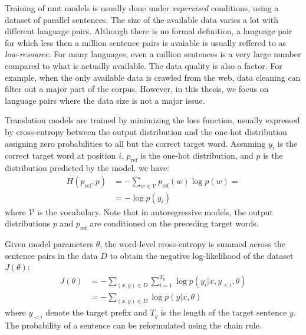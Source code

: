 Training of \ac{nmt} models is usually done under \emph{supervised} conditions,
using a dataset of parallel sentences. The size of the available data varies a
lot with different language pairs. Although there is no formal definition, a
language pair for which less then a million sentence pairs is avaiable is
usually reffered to as \emph{low-resource}. For many languages, even a million
sentences is a very large number compared to what is actually available. The
data quality is also a factor. For example, when the only available data is
crawled from the web, data cleaning can filter out a major part of the
corpus. However, in this thesis, we focus on language pairs where the data size
is not a major issue.

Translation models are trained by minimizing the loss function, usually
expressed by cross-entropy between the output distribution and the one-hot
distribution assigning zero probabilities to all but the correct target
word. Assuming $y_i$ is the correct target word at position $i$,
$p_{\text{ref}}$ is the one-hot distribution, and $p$ is the distribution
predicted by the model, we have:
%
\begin{equation}
  \begin{split}
    H(p_{\text{ref}}, p) &=  - \sum_{w \in \mathcal{V}} p_{\text{ref}}(w) \log p(w) = \\
    &=  - \log p(y_i)
  \end{split}
\end{equation}
%
where $\mathcal{V}$ is the vocabulary. Note that in autoregressive models, the
output distributions $p$ and $p_{\text{ref}}$ are conditioned on the preceding
target words.

Given model parameters $\theta$, the word-level cross-entropy is summed across
the sentence pairs in the data $D$ to obtain the negative log-likelihood of the
dataset $J(\theta)$:
%
\begin{equation}
  \begin{split}
  J(\theta) &= - \sum_{(x, y) \in D} \sum_{i = 1}^{T_y} \log p(y_i | x, y_{<i}, \theta) \\
  &= - \sum_{(x, y) \in D} \log p(y | x, \theta)
  \end{split} \label{eq:loss}
\end{equation}
%
where $y_{<i}$ denote the target prefix and $T_{y}$ is the length of the target
sentence $y$. The probability of a sentence can be reformulated using the chain
rule.

